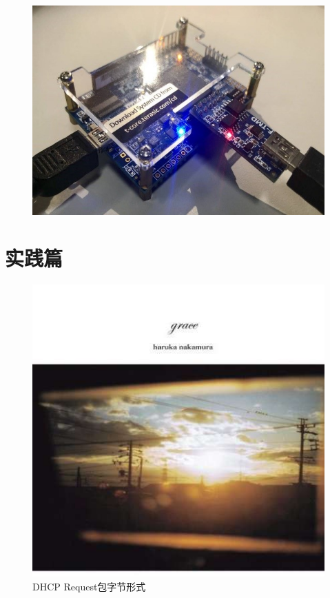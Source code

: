 \documentclass[a4paper, 14pt, oneside]{book} %
\numberwithin{equation}{subsection}
\begin{document}
			\begin{figure}[!htbp]
				\centering
				\includegraphics[scale=1]{img/six.jpg}
			\end{figure}

	\section{实践篇}
	
	\begin{figure}[H]
		\centering  
		\includegraphics[scale=0.7]{img/avatar.jpg}   
		\caption{DHCP Request包字节形式}
	\end{figure}
\end{document}
